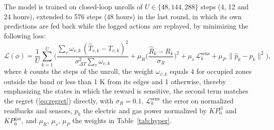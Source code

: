 \documentclass{article}
\begin{document}
The model is trained on closed-loop unrolls of $U \in \{48, 144, 288\}$ steps (4, 12 and 24 hours), extended to 576 steps (48 hours) in the last round, in which its own predictions are fed back while the logged actions are replayed, by minimizing the following loss:
\begin{equation}
\mathcal{L}(\phi) = \frac{1}{U} \sum_{k=1}^{U} \Big( \frac{\sum_v \omega_{v,k}\, (\hat{T}_{v,k} - T_{v,k})^2}{\sigma_{\Delta T}^2 \sum_v \omega_{v,k}} + \mu_R \Big(\frac{\hat{R}_k - R_k}{\sigma_R}\Big)^2 + \mu_s\, \mathcal{L}^{\mathrm{sens}}_k + \mu_P\, \big\| \hat{p}_k - p_k \big\|^2 \Big),
\label{eq:wmloss}
\end{equation}
where $k$ counts the steps of the unroll, the weight $\omega_{v,k}$ equals 4 for occupied zones outside the band or less than 1 K from its edges and 1 otherwise, thereby emphasizing the states in which the reward is sensitive, the second term matches the regret (\ref{eq:regret}) directly, with $\sigma_R = 0.1$, $\mathcal{L}^{\mathrm{sens}}_k$ the error on normalized readbacks and sensors, $p_k$ the electric and gas power normalized by $K P^{\mathrm{el}}_0$ and $K P^{\mathrm{gas}}_0$, and $\mu_R$, $\mu_s$, $\mu_P$ the weights in Table~\ref{tab:hyper}.
\end{document}
